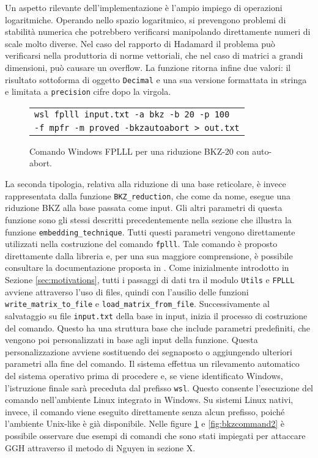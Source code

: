 Un aspetto rilevante dell'implementazione è l'ampio impiego di operazioni logaritmiche.
Operando nello spazio logaritmico, si prevengono problemi di stabilità numerica che 
potrebbero verificarsi manipolando direttamente numeri di scale molto diverse. Nel caso
del rapporto di Hadamard il problema può verificarsi nella produttoria di norme vettoriali,
che nel caso di matrici a grandi dimensioni, può causare un overflow. 
La funzione ritorna infine due valori: il risultato sottoforma di oggetto \texttt{Decimal}
e una sua versione formattata in stringa e limitata a \texttt{precision} cifre dopo la virgola. \\

\begin{figure}[h]
    \centering
    \begin{tabular}{l}
        \texttt{wsl fplll input.txt -a bkz -b 20 -p 100} \\
        \texttt{-f mpfr -m proved -bkzautoabort > out.txt}
    \end{tabular}
    \caption{Comando Windows FPLLL per una riduzione BKZ-20 con auto-abort.}
    \label{fig:bkzcommand1}
\end{figure}

La seconda tipologia, relativa alla riduzione di una base reticolare, è invece rappresentata
dalla funzione \texttt{BKZ\_reduction}, che come da nome, esegue una riduzione BKZ alla 
base passata come input. Gli altri parametri di questa funzione sono gli stessi 
descritti precedentemente nella sezione che illustra la funzione \texttt{embedding\_technique}. 
Tutti questi parametri vengono direttamente utilizzati nella costruzione del comando 
\texttt{fplll}. Tale comando è proposto direttamente dalla libreria e, per una sua 
maggiore comprensione, è possibile consultare la documentazione proposta in \cite{FPLLL}.
Come inizialmente introdotto in Sezione \ref{sec:motivations}, tutti i passaggi di dati 
tra il modulo \texttt{Utils} e \texttt{FPLLL} avviene attraverso l'uso di files, quindi 
con l'ausilio delle funzioni \texttt{write\_matrix\_to\_file} e \texttt{load\_matrix\_from\_file}.
Successivamente al salvataggio su file \texttt{input.txt} della base in input, inizia
il processo di costruzione del comando. 
Questo ha una struttura base che include parametri predefiniti, che vengono poi personalizzati 
in base agli input della funzione. Questa personalizzazione avviene sostituendo dei 
segnaposto o aggiungendo ulteriori parametri alla fine del comando. 
Il sistema effettua un rilevamento automatico del sistema operativo prima di procedere e,  
se viene identificato Windows, l'istruzione finale sarà preceduta dal prefisso \texttt{wsl}. 
Questo consente l'esecuzione del comando nell'ambiente Linux integrato in Windows. 
Su sistemi Linux nativi, invece, il comando viene eseguito 
direttamente senza alcun prefisso, poiché l'ambiente Unix-like è già disponibile.
Nelle figure 
\ref{fig:bkzcommand1} e \ref{fig:bkzcommand2} è possibile osservare due esempi di comandi
che sono stati impiegati per attaccare GGH attraverso il metodo di Nguyen in sezione X.  

